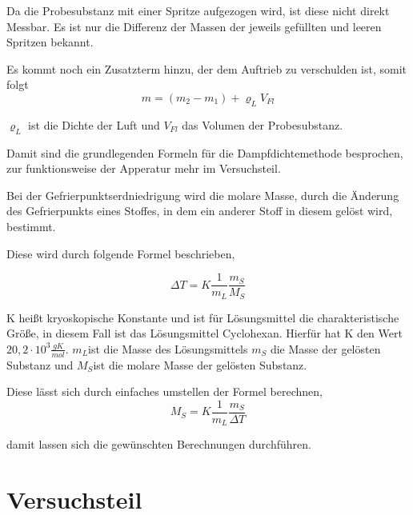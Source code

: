 Da die Probesubstanz mit einer Spritze aufgezogen wird, ist diese
nicht direkt Messbar. Es ist nur die Differenz der Massen der jeweils
gefüllten und leeren Spritzen bekannt.

Es kommt noch ein Zusatzterm hinzu, der dem Auftrieb zu verschulden
ist, somit folgt
\begin{equation}
m=\left(m_{2}-m_{1}\right)+\varrho_{L}V_{Fl}\label{eq:masse}
\end{equation}


$\varrho_{L}$ ist die Dichte der Luft und $V_{Fl}$ das Volumen der
Probesubstanz.

Damit sind die grundlegenden Formeln für die Dampfdichtemethode besprochen,
zur funktionsweise der Apperatur mehr im Versuchsteil.

Bei der Gefrierpunktserdniedrigung wird die molare Masse, durch die
Änderung des Gefrierpunkts eines Stoffes, in dem ein anderer Stoff
in diesem gelöst wird, bestimmt.

Diese wird durch folgende Formel beschrieben,

\begin{equation}
\Delta T=K\frac{1}{m_{L}}\frac{m_{S}}{M_{S}}\label{eq:Temp_diff}
\end{equation}


K heißt kryoskopische Konstante und ist für Lösungsmittel die charakteristische
Größe, in diesem Fall ist das Lösungsmittel Cyclohexan. Hierfür hat
K den Wert $20,2\cdot10^{3}\frac{gK}{mol}$. $m_{L}$ist die Masse
des Lösungsmittels $m_{S}$ die Masse der gelösten Substanz und $M_{S}$ist
die molare Masse der gelösten Substanz.

Diese lässt sich durch einfaches umstellen der Formel berechnen,
\begin{equation}
M_{S}=K\frac{1}{m_{L}}\frac{m_{S}}{\Delta T}\label{eq:molareMasse}
\end{equation}


damit lassen sich die gewünschten Berechnungen durchführen.
\newpage
\section{Versuchsteil}
